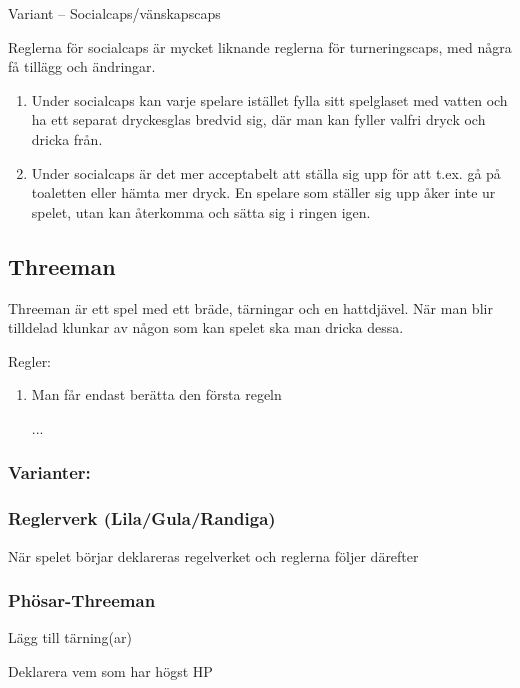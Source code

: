 Variant -- Socialcaps/vänskapscaps

Reglerna för socialcaps är mycket liknande reglerna för turneringscaps,
med några få tillägg och ändringar.

\begin{enumerate}
\def\labelenumi{\arabic{enumi}.}
\item
  Under socialcaps kan varje spelare istället fylla sitt spelglaset med
  vatten och ha ett separat dryckesglas bredvid sig, där man kan fyller
  valfri dryck och dricka från.
\item
  Under socialcaps är det mer acceptabelt att ställa sig upp för att
  t.ex. gå på toaletten eller hämta mer dryck. En spelare som ställer
  sig upp åker inte ur spelet, utan kan återkomma och sätta sig i ringen
  igen.
\end{enumerate}


\subsection*{\textbf{Threeman}}

Threeman är ett spel med ett bräde, tärningar och en hattdjävel. När man blir
tilldelad klunkar av någon som kan spelet ska man dricka dessa.

Regler:

\begin{enumerate}
    \item Man får endast berätta den första regeln
    \item[...]
\end{enumerate}

\subsubsection*{Varianter:}

\subsubsection*{Reglerverk (Lila/Gula/Randiga)}

När spelet börjar deklareras regelverket och reglerna följer därefter

\subsubsection*{Phösar-Threeman}

Lägg till tärning(ar)

Deklarera vem som har högst HP

